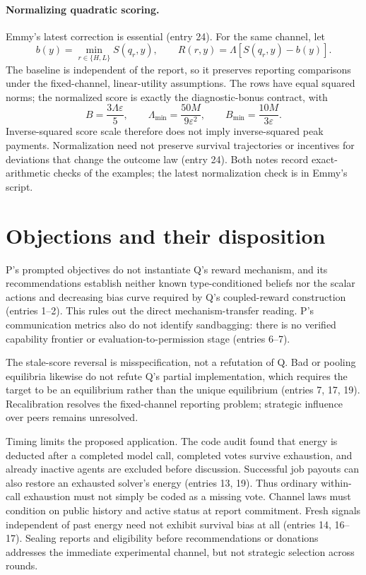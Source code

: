 \documentclass{article}
\begin{document}
\paragraph{Normalizing quadratic scoring.}
Emmy's latest correction is essential (entry 24).
For the same channel, let
\[
 b(y)=\min_{r\in\{H,L\}}S(q_r,y),\qquad
 R(r,y)=\Lambda[S(q_r,y)-b(y)].
\]
The baseline is independent of the report, so it preserves reporting comparisons under the
fixed-channel, linear-utility assumptions.
The rows have equal squared norms; the normalized score is exactly the diagnostic-bonus contract,
with
\[
 B=\frac{3\Lambda\varepsilon}{5},\qquad
 \Lambda_{\min}=\frac{50M}{9\varepsilon^2},\qquad
 B_{\min}=\frac{10M}{3\varepsilon}.
\]
Inverse-squared score scale therefore does not imply inverse-squared peak payments.
Normalization need not preserve survival trajectories or incentives for deviations that change the
outcome law (entry 24).
Both notes record exact-arithmetic checks of the examples; the latest normalization check is in
Emmy's script.

\section*{Objections and their disposition}
P's prompted objectives do not instantiate Q's reward mechanism, and its recommendations establish
neither known type-conditioned beliefs nor the scalar actions and decreasing bias curve required by
Q's coupled-reward construction (entries 1--2).
This rules out the direct mechanism-transfer reading.
P's communication metrics also do not identify sandbagging: there is no verified capability frontier
or evaluation-to-permission stage (entries 6--7).

The stale-score reversal is misspecification, not a refutation of Q.
Bad or pooling equilibria likewise do not refute Q's partial implementation, which requires the
target to be an equilibrium rather than the unique equilibrium (entries 7, 17, 19).
Recalibration resolves the fixed-channel reporting problem; strategic influence over peers remains
unresolved.

Timing limits the proposed application.
The code audit found that energy is deducted after a completed model call, completed votes survive
exhaustion, and already inactive agents are excluded before discussion.
Successful job payouts can also restore an exhausted solver's energy (entries 13, 19).
Thus ordinary within-call exhaustion must not simply be coded as a missing vote.
Channel laws must condition on public history and active status at report commitment.
Fresh signals independent of past energy need not exhibit survival bias at all (entries 14, 16--17).
Sealing reports and eligibility before recommendations or donations addresses the immediate
experimental channel, but not strategic selection across rounds.
\end{document}
